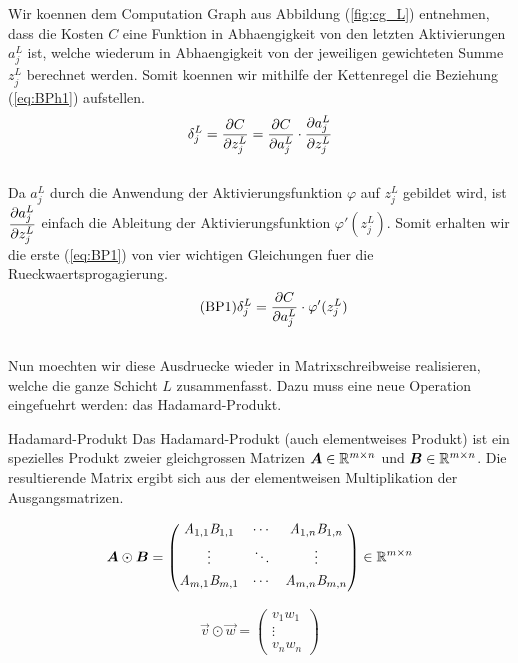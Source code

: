\para{}
Wir koennen dem Computation Graph aus Abbildung (\ref{fig:cg_L}) entnehmen, dass die Kosten $C$ eine Funktion
in Abhaengigkeit von den letzten Aktivierungen $a_j^L$ ist, welche wiederum in
Abhaengigkeit von der jeweiligen gewichteten Summe $z_j^L$ berechnet werden.
Somit koennen wir mithilfe der Kettenregel die Beziehung (\ref{eq:BPh1}) aufstellen.
\\
\begin{equation}\label{eq:BPh1}
  \delta_j^L = \frac{\partial C}{\partial z_j^L} = \frac{\partial C}{\partial a_j^L} \cdot \frac{\partial a_j^L}{\partial z_j^L}
\end{equation}
\\
Da $a_j^L$ durch die Anwendung der Aktivierungsfunktion $\varphi$ auf $z_j^L$
gebildet wird, ist $\displaystyle\frac{\partial a_j^L}{\partial z_j^L}$ einfach die Ableitung der Aktivierungsfunktion
$\varphi'(z_j^L)$. Somit erhalten wir die erste (\ref{eq:BP1}) von vier
wichtigen Gleichungen fuer die Rueckwaertsprogagierung.
\\
\begin{equation}\tag{BP1}\label{eq:BP1}
  \delta_j^L = \frac{\partial C}{\partial a_j^L} \cdot \varphi'(z_j^L)
\end{equation}
\\
Nun moechten wir diese Ausdruecke wieder in Matrixschreibweise realisieren,
welche die ganze Schicht $L$ zusammenfasst. Dazu
muss eine neue Operation eingefuehrt werden: das Hadamard-Produkt.

\begin{defbox}{Hadamard-Produkt}
  Das Hadamard-Produkt (auch elementweises Produkt) ist ein spezielles Produkt zweier gleichgrossen Matrizen
  $\bm{A} \in \mathbb{R}^{m \times n}$ und $\bm{B} \in \mathbb{R}^{m \times n}$.
  Die resultierende Matrix ergibt sich aus der elementweisen Multiplikation der Ausgangsmatrizen.

  \begin{minipage}{0.5\textwidth}
    \begin{equation*}
      \bm{A} \odot \bm{B} =
      \begin{pmatrix}
        \mathit{A}_{1,1} \mathit{B}_{1,1} & \cdots & \mathit{A}_{1,n} \mathit{B}_{1,n} \\[0.3em]
        \vdots & \ddots & \vdots \\[0.3em]
        \mathit{A}_{m,1} \mathit{B}_{m,1} & \cdots & \mathit{A}_{m,n} \mathit{B}_{m,n} \\[0.3em]
      \end{pmatrix}
      \in \mathbb{R}^{m \times n}
    \end{equation*}
  \end{minipage}
  \begin{minipage}{0.5\textwidth}
    \begin{equation*}
      \vec{v} \odot \vec{w} =
      \begin{pmatrix}
        v_1 w_1 \\
        \vdots \\
        v_n w_n
      \end{pmatrix}
    \end{equation*}

  \end{minipage}
\end{defbox}
\para{}

